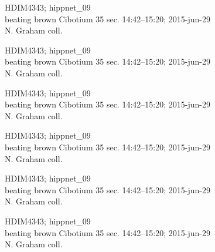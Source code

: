 \documentclass[2pt]{extarticle}
\begin{document}
\noindent
\parbox{0.16\textwidth}{\tiny \raggedright \rule[-0.3\baselineskip]{0pt}{10pt}HDIM4343; hippnet\_09\\ beating brown Cibotium 35 sec. 14:42--15:20; 2015-jun-29\\ N. Graham coll.}
\parbox{0.16\textwidth}{\tiny \raggedright \rule[-0.3\baselineskip]{0pt}{10pt}HDIM4343; hippnet\_09\\ beating brown Cibotium 35 sec. 14:42--15:20; 2015-jun-29\\ N. Graham coll.}
\parbox{0.16\textwidth}{\tiny \raggedright \rule[-0.3\baselineskip]{0pt}{10pt}HDIM4343; hippnet\_09\\ beating brown Cibotium 35 sec. 14:42--15:20; 2015-jun-29\\ N. Graham coll.}
\parbox{0.16\textwidth}{\tiny \raggedright \rule[-0.3\baselineskip]{0pt}{10pt}HDIM4343; hippnet\_09\\ beating brown Cibotium 35 sec. 14:42--15:20; 2015-jun-29\\ N. Graham coll.}
\parbox{0.16\textwidth}{\tiny \raggedright \rule[-0.3\baselineskip]{0pt}{10pt}HDIM4343; hippnet\_09\\ beating brown Cibotium 35 sec. 14:42--15:20; 2015-jun-29\\ N. Graham coll.}
\parbox{0.16\textwidth}{\tiny \raggedright \rule[-0.3\baselineskip]{0pt}{10pt}HDIM4343; hippnet\_09\\ beating brown Cibotium 35 sec. 14:42--15:20; 2015-jun-29\\ N. Graham coll.} \\ 
\vspace{0.001in} 
\end{document}
